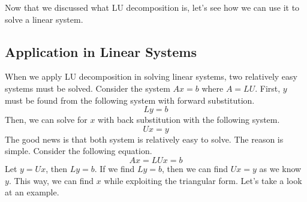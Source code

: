 \documentclass[../main.tex]{subfiles}
\begin{document}
Now that we discussed what LU decomposition is, let's see how
we can use it to solve a linear system.

\subsection{Application in Linear Systems}

When we apply LU decomposition in solving linear systems, two
relatively easy systems must be solved. Consider the system
$Ax = b$ where $A = LU$. First, $y$ must be found from the
following system with forward substitution.
\[
Ly = b
\]
Then, we can solve for $x$ with back substitution with the following
system.
\[
Ux = y
\]
The good news is that both system is relatively easy to solve.
The reason is simple. Consider the following equation.
\[
Ax = LUx = b
\]
Let $y = Ux$, then $Ly = b$. If we find $Ly = b$, then we can find
$Ux = y$ as we know $y$. This way, we can find $x$ while exploiting
the triangular form. Let's take a look at an example.
\end{document}
